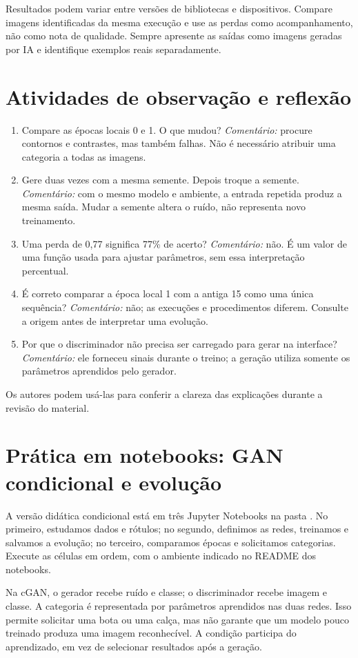 \documentclass[12pt,a4paper]{article}
\begin{document}
Resultados podem variar entre versões de bibliotecas e dispositivos. Compare imagens identificadas da mesma execução e use as perdas como acompanhamento, não como nota de qualidade. Sempre apresente as saídas como imagens geradas por IA e identifique exemplos reais separadamente.

\section{Atividades de observação e reflexão}
\begin{enumerate}
\item Compare as épocas locais 0 e 1. O que mudou? \textit{Comentário:} procure contornos e contrastes, mas também falhas. Não é necessário atribuir uma categoria a todas as imagens.
\item Gere duas vezes com a mesma semente. Depois troque a semente. \textit{Comentário:} com o mesmo modelo e ambiente, a entrada repetida produz a mesma saída. Mudar a semente altera o ruído, não representa novo treinamento.
\item Uma perda de 0,77 significa 77\% de acerto? \textit{Comentário:} não. É um valor de uma função usada para ajustar parâmetros, sem essa interpretação percentual.
\item É correto comparar a época local 1 com a antiga 15 como uma única sequência? \textit{Comentário:} não; as execuções e procedimentos diferem. Consulte a origem antes de interpretar uma evolução.
\item Por que o discriminador não precisa ser carregado para gerar na interface? \textit{Comentário:} ele forneceu sinais durante o treino; a geração utiliza somente os parâmetros aprendidos pelo gerador.
\end{enumerate}
Os autores podem usá-las para conferir a clareza das explicações durante a revisão do material.

\section{Prática em notebooks: GAN condicional e evolução}
A versão didática condicional está em três Jupyter Notebooks na pasta . No primeiro, estudamos dados e rótulos; no segundo, definimos as redes, treinamos e salvamos a evolução; no terceiro, comparamos épocas e solicitamos categorias. Execute as células em ordem, com o ambiente indicado no README dos notebooks.

Na cGAN, o gerador recebe ruído e classe; o discriminador recebe imagem e classe. A categoria é representada por parâmetros aprendidos nas duas redes. Isso permite solicitar uma bota ou uma calça, mas não garante que um modelo pouco treinado produza uma imagem reconhecível. A condição participa do aprendizado, em vez de selecionar resultados após a geração.
\end{document}

